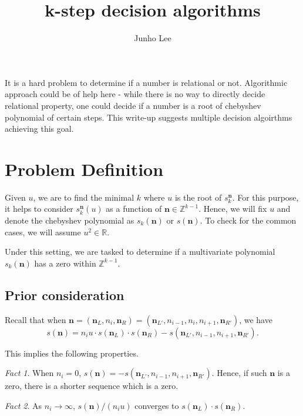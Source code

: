 \documentclass{article}
\title{k-step decision algorithms}
\author{Junho Lee}
\theoremstyle{definition}
\theoremstyle{plain}
\theoremstyle{remark}
\newtheorem*{fact}{Fact}
\numberwithin{equation}{section}
\newcommand{\bZ}{\mathbb{Z}}
\newcommand{\bR}{\mathbb{R}}
\begin{document}
\pagecolor{white}
\color{black}
\maketitle

It is a hard problem to determine if a number is relational or not.
Algorithmic approach could be of help here -
while there is no way to directly decide relational property,
one could decide if a number is a root of chebyshev polynomial of certain steps.
This write-up suggests multiple decision algoirthms achieving this goal.

\section{Problem Definition}

Given $u$, we are to find the minimal $k$ where $u$ is the root of $s^{\mathbf{n}}_k$.
For this purpose, it helps to consider $s^{\mathbf{n}}_k(u)$ as a function of $\mathbf{n} \in \bZ^{k-1}$.
Hence, we will fix $u$ and denote the chebyshev polynomial as $s_k(\mathbf{n})$ or $s(\mathbf{n})$.
To check for the common cases, we will assume $u^2 \in \bR$.

Under this setting, we are tasked to determine if a multivariate polynomial $s_k(\mathbf{n})$
has a zero within $\bZ^{k-1}$.

\subsection{Prior consideration}

Recall that when $\mathbf{n} = (\mathbf{n}_L, n_i, \mathbf{n}_R)
  = (\mathbf{n}_{L'}, n_{i-1}, n_i, n_{i+1}, \mathbf{n}_{R'})$,
we have
\begin{equation}\label{key_equation}
  s(\mathbf{n}) =
  n_i u \cdot s(\mathbf{n}_L) \cdot s(\mathbf{n}_R)
  - s(\mathbf{n}_{L'}, n_{i-1}, n_{i+1}, \mathbf{n}_{R'}).
\end{equation}

This implies the following properties.
\begin{fact}
  When $n_i = 0$, $s(\mathbf{n}) = - s(\mathbf{n}_{L'}, n_{i-1}, n_{i+1}, \mathbf{n}_{R'})$.
  Hence, if such $\mathbf{n}$ is a zero, there is a shorter sequence which is a zero.
\end{fact}
\begin{fact}
  As $n_i \to \infty$, $s(\mathbf{n}) / (n_i u)$ converges to $s(\mathbf{n}_L) \cdot s(\mathbf{n}_R)$.
\end{fact}
\end{document}

